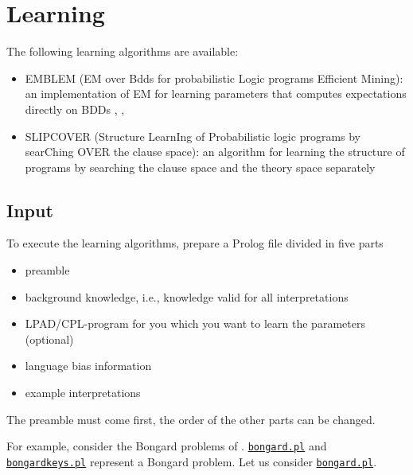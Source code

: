 \section{Learning}
\label{learning}
The following learning algorithms are available:
\begin{itemize}
\item EMBLEM (EM over Bdds for probabilistic Logic programs Efficient Mining): an implementation of EM for learning parameters that computes expectations directly on BDDs \cite{BelRig11-IDA-IJ}, \cite{BelRig11-CILC11-NC}, \cite{BelRig11-TR}
\item SLIPCOVER (Structure LearnIng of Probabilistic logic programs by searChing OVER the clause space): an algorithm for learning the structure of programs by searching the clause space and the theory space separately \cite{BelRig13-TPLP-IJ}
\end{itemize}

\subsection{Input}
To execute the learning algorithms, prepare a Prolog file divided in five parts
\begin{itemize}
\item preamble
\item  background knowledge, i.e., knowledge valid for all interpretations
\item  LPAD/CPL-program for you which you want to learn the parameters (optional)
\item language bias information
\item  example interpretations 
\end{itemize}
The preamble must come first, the order of the other parts can be changed.

For example, consider the Bongard problems of \cite{RaeLae95-ALT95}. 
\href{http://cplint.lamping.unife.it/example/learning/bongard.pl}{\texttt{bongard.pl}} and \href{http://cplint.lamping.unife.it/example/learning/bongardkeys.pl}{\texttt{bongardkeys.pl}} represent a Bongard problem.
Let us consider \href{http://cplint.lamping.unife.it/example/learning/bongard.pl}{\texttt{bongard.pl}}.


